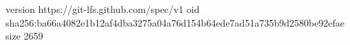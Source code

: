 version https://git-lfs.github.com/spec/v1
oid sha256:ba66a4082e1b12af4dba3275a04a76d154b64ede7ad51a735b9d2580be92efae
size 2659
